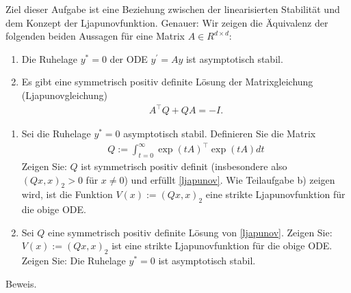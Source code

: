 \begin{exercise}
Ziel dieser Aufgabe ist eine Beziehung zwischen der linearisierten Stabilität und
dem Konzept der Ljapunovfunktion. Genauer: Wir zeigen die Äquivalenz der folgenden
beiden Aussagen für eine Matrix $A \in R^{d \times d}$:
\begin{enumerate}
  \item Die Ruhelage $y^* = 0$ der ODE $y^{\prime} = Ay$ ist asymptotisch stabil.
  \item Es gibt eine symmetrisch positiv definite Lösung der Matrixgleichung
  (\glqq Ljapunovgleichung\grqq)
  \begin{align} \label{ljapunov}
    A^{\top}Q + QA = -I.
  \end{align}
\end{enumerate}
\begin{enumerate}[label = \textbf{\alph*)}]
  \item Sei die Ruhelage $y^* = 0$ asymptotisch stabil. Definieren Sie die Matrix
  \begin{align*}
    Q := \int_{t = 0}^{\infty} \exp(tA)^{\top}\exp(tA) dt
  \end{align*}
  Zeigen Sie: $Q$ ist symmetrisch positiv definit (insbesondere also $(Qx,x)_2 > 0$
  für $x \neq 0$) und erfüllt \eqref{ljapunov}. Wie Teilaufgabe b) zeigen wird,
  ist die Funktion $V(x) := (Qx,x)_2$ eine strikte Ljapunovfunktion für die obige ODE.
  \item Sei $Q$ eine symmetrisch positiv definite Lösung von \eqref{ljapunov}.
  Zeigen Sie: $V(x) := (Qx,x)_2$ ist eine strikte Ljapunovfunktion für die obige ODE.
  Zeigen Sie: Die Ruhelage $y^* = 0$ ist asymptotisch stabil.
\end{enumerate}
\end{exercise}
\begin{solution}
Beweis.
\end{solution}
